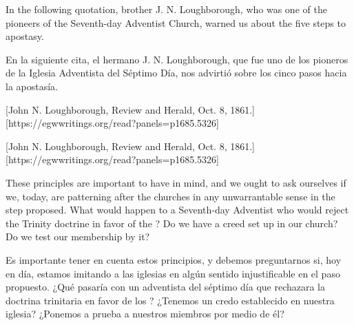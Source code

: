 



In the following quotation, brother J. N. Loughborough, who was one of the pioneers of the Seventh-day Adventist Church, warned us about the five steps to apostasy.


En la siguiente cita, el hermano J. N. Loughborough, que fue uno de los pioneros de la Iglesia Adventista del Séptimo Día, nos advirtió sobre los cinco pasos hacia la apostasía.


[John N. Loughborough, Review and Herald, Oct. 8, 1861.][https://egwwritings.org/read?panels=p1685.5326]


[John N. Loughborough, Review and Herald, Oct. 8, 1861.][https://egwwritings.org/read?panels=p1685.5326]


These principles are important to have in mind, and we ought to ask ourselves if we, today, are patterning after the churches in any unwarrantable sense in the step proposed. What would happen to a Seventh-day Adventist who would reject the Trinity doctrine in favor of the ? Do we have a creed set up in our church? Do we test our membership by it?


Es importante tener en cuenta estos principios, y debemos preguntarnos si, hoy en día, estamos imitando a las iglesias en algún sentido injustificable en el paso propuesto. ¿Qué pasaría con un adventista del séptimo día que rechazara la doctrina trinitaria en favor de los ? ¿Tenemos un credo establecido en nuestra iglesia? ¿Ponemos a prueba a nuestros miembros por medio de él?



